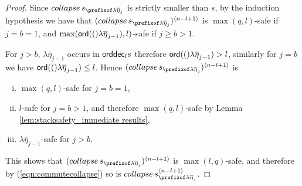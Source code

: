 \documentclass[a4paper,draft]{article}
\theoremstyle{remark}
\theoremstyle{definition}
\newcommand\orddec{{\sf orddec}}
\begin{document}
\begin{proof}
Since $collapse\,s_{\prefixof \lambda\overline\eta_j}$ is strictly smaller than $s$, by the induction hypothesis we have that
$(collapse\,s_{\prefixof \lambda\overline\eta_j})^{\langle n-l+1\rangle}$ is $\max(q,l)$-safe
if $j=b=1$, and $\max({\sf ord}(()\lambda\overline\eta_{j-1}),l)$-safe if $j\geq b>1$.

For $j>b$, $\lambda\overline\eta_{j-1}$ occurs in $\orddec_l s$ therefore ${\sf ord}(()\lambda\overline\eta_{j-1}) > l$,
similarly for $j=b$ we have ${\sf ord}(()\lambda\overline\eta_{j-1}) \leq l$.
Hence $(collapse\,s_{\prefixof \lambda\overline\eta_j})^{\langle n-l+1\rangle}$ is
\begin{enumerate}[(i)]
\item $\max(q,l)$-safe for $j=b=1$,
\item $l$-safe for $j=b>1$, and therefore $\max(q,l)$-safe by Lemma \ref{lem:stacksafety_immediate results},
\item $\lambda\overline\eta_{j-1}$-safe for $j>b$.
\end{enumerate}
This shows that $(collapse\,s_{\prefixof \lambda\overline\eta_j})^{\langle n-l+1\rangle}$ is $\max(l,q)$-safe, and therefore by (\ref{eqn:commutecollapse})
so is $collapse\, s^{\langle n-l+1 \rangle}_{\prefixof \lambda \overline{\eta}_{j}}$.
\end{proof}
\end{document}
